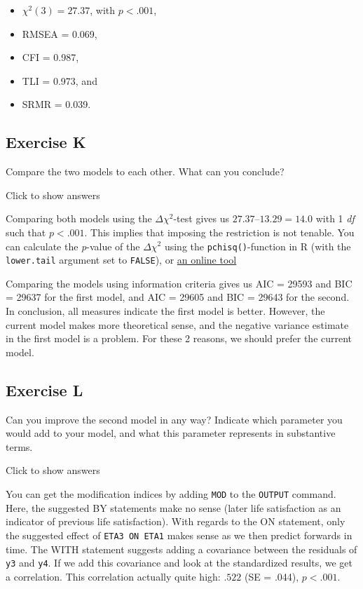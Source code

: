 \documentclass[
]{book}
\providecommand{\tightlist}{%
  \setlength{\itemsep}{0pt}\setlength{\parskip}{0pt}}
\begin{document}
\begin{itemize}
\tightlist
\item
  \(\chi^{2} (3) = 27.37\), with \(p < .001\),
\item
  RMSEA = 0.069,
\item
  CFI = 0.987,
\item
  TLI = 0.973, and
\item
  SRMR = 0.039.
\end{itemize}

\hypertarget{exercise-k}{%
\subsection{Exercise K}\label{exercise-k}}

Compare the two models to each other. What can you conclude?

Click to show answers

Comparing both models using the \(\Delta \chi^{2}\)-test gives us \(27.37 – 13.29 = 14.0\) with 1 \emph{df} such that \(p < .001\). This implies that imposing the restriction is not tenable. You can calculate the \emph{p}-value of the \(\Delta \chi^{2}\) using the \texttt{pchisq()}-function in R (with the \texttt{lower.tail} argument set to \texttt{FALSE}), or \href{http://www.fourmilab.ch/rpkp/experiments/analysis/chiCalc.html}{an online tool}

Comparing the models using information criteria gives us AIC = 29593 and BIC = 29637 for the first model, and AIC = 29605 and BIC = 29643 for the second. In conclusion, all measures indicate the first model is better. However, the current model makes more theoretical sense, and the negative variance estimate in the first model is a problem. For these 2 reasons, we should prefer the current model.

\hypertarget{exercise-l}{%
\subsection{Exercise L}\label{exercise-l}}

Can you improve the second model in any way? Indicate which parameter you would add to your model, and what this parameter represents in substantive terms.

Click to show answers

You can get the modification indices by adding \texttt{MOD} to the \texttt{OUTPUT} command. Here, the suggested BY statements make no sense (later life satisfaction as an indicator of previous life satisfaction). With regards to the ON statement, only the suggested effect of \texttt{ETA3\ ON\ ETA1} makes sense as we then predict forwards in time. The WITH statement suggests adding a covariance between the residuals of \texttt{y3} and \texttt{y4}. If we add this covariance and look at the standardized results, we get a correlation. This correlation actually quite high: \(.522\) (SE = .044), \(p < .001\).
\end{document}
